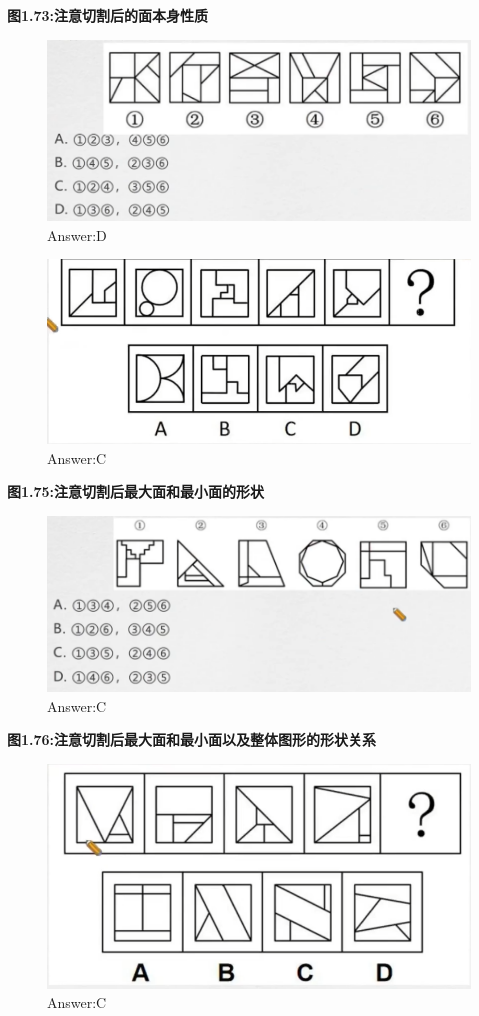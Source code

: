 \documentclass{article}
\numberwithin{equation}{section}						%
\numberwithin{figure}{section}							%
\begin{document}
\begin{sloppypar}
\textbf{图1.73:注意切割后的面本身性质}


\begin{figure}[H]
     \centering
     \includegraphics[width=0.6\linewidth]{77.png}
		\caption{Answer:D}
\end{figure}


\begin{figure}[H]
     \centering
     \includegraphics[width=0.6\linewidth]{78.png}
		\caption{Answer:C}
\end{figure}

\textbf{图1.75:注意切割后最大面和最小面的形状}

\begin{figure}[H]
     \centering
     \includegraphics[width=0.6\linewidth]{79.png}
		\caption{Answer:C}
\end{figure}

\textbf{图1.76:注意切割后最大面和最小面以及整体图形的形状关系}

\begin{figure}[H]
     \centering
     \includegraphics[width=0.6\linewidth]{80.png}
		\caption{Answer:C}
\end{figure}





\end{sloppypar}
\end{document}
